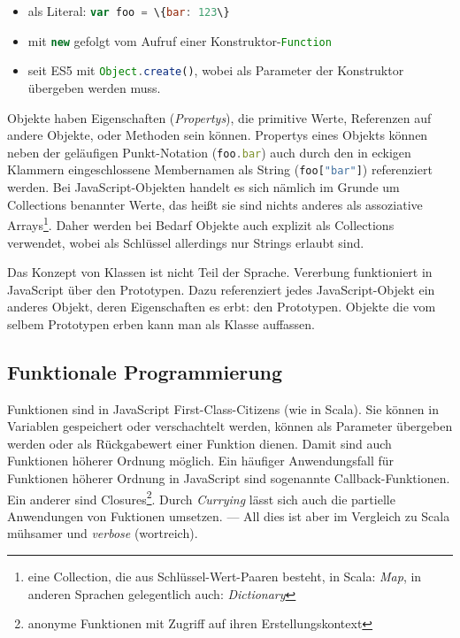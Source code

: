 \documentclass[a4paper, 12pt, hidelinks, listof=totoc, listoftables=totoc, bibliography=totoc]{scrreprt}
\newcommand{\code}[1]{\lstinline[language=Scala, style=inline]|#1|}
\newcommand{\js}[1]{\lstinline[language=JavaScript, style=inline]|#1|}
\begin{document}
\begin{itemize}
  \item als Literal: \js{var foo = \{bar: 123\}}
  \item mit \js{new} gefolgt vom Aufruf einer Konstruktor-\code{Function}
  \item seit ES5 mit \js{Object.create()}, wobei als Parameter der Konstruktor übergeben werden muss.
\end{itemize}

Objekte haben Eigenschaften (\emph{Propertys}), die primitive Werte, Referenzen auf andere Objekte, oder Methoden sein können. Propertys eines Objekts können neben der geläufigen Punkt-Notation (\js{foo.bar}) auch durch den in eckigen Klammern eingeschlossene Membernamen als String \mbox{(\js{foo["bar"]})} referenziert werden. Bei JavaScript-Objekten handelt es sich nämlich im Grunde um Collections benannter Werte, das heißt sie sind nichts anderes als assoziative Arrays\footnote{eine Collection, die aus Schlüssel-Wert-Paaren besteht, in Scala: \emph{Map}, in anderen Sprachen gelegentlich auch: \emph{Dictionary}}. Daher werden bei Bedarf Objekte auch explizit als Collections verwendet, wobei als Schlüssel allerdings nur Strings erlaubt sind.

Das Konzept von Klassen ist nicht Teil der Sprache. Vererbung funktioniert in JavaScript über den Prototypen. Dazu referenziert jedes JavaScript-Objekt ein anderes Objekt, deren Eigenschaften es erbt: den Prototypen. Objekte die vom selbem Prototypen erben kann man als Klasse auffassen.\cite{mdn.WWO}\cite[S. 115 ff., S. 199 ff.]{flanagan2011.JDG}

\subsection{Funktionale Programmierung}

Funktionen sind in JavaScript First-Class-Citizens (wie in Scala). Sie können in Variablen gespeichert oder verschachtelt werden, können als Parameter übergeben werden oder als Rückgabewert einer Funktion dienen. Damit sind auch Funktionen höherer Ordnung möglich. Ein häufiger Anwendungsfall für Funktionen höherer Ordnung in JavaScript sind sogenannte Callback-Funktionen. Ein anderer sind Closures\footnote{anonyme Funktionen mit Zugriff auf ihren Erstellungskontext}. Durch \emph{Currying} lässt sich auch die partielle Anwendungen von Fuktionen umsetzen. --- All dies ist aber im Vergleich zu Scala mühsamer und \emph{verbose} (wortreich).
\end{document}
